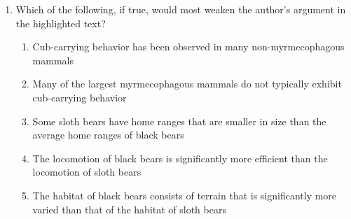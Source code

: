 \documentclass[12pt]{article}
\begin{document}
\begin{enumerate}[label=\textbf{\arabic*.}]
\begin{multicols}{2}

\begin{enumerate}[label=(\Alph*)]

\item explain why sloth bears are not successful foragers in grassland habitats

\item identify the predators that have had the most influence on the behavior of sloth bears

\item suggest a possible reason that sloth bear cubs do not use tree-climbing as a defense

\item provide examples of predators that were once widespread across the Indian subcontinent

\item defend the assertion that sloth bears are under greater threat from dangerous animals than are other bear species

\end{enumerate}

\end{multicols}

\item Which of the following, if true, would most weaken the author's argument in the highlighted text?

\begin{multicols}{2}

\begin{enumerate}[label=(\Alph*)]

\item Cub-carrying behavior has been observed in many non-myrmecophagous mammals

\item Many of the largest myrmecophagous mammals do not typically exhibit cub-carrying behavior

\item Some sloth bears have home ranges that are smaller in size than the average home ranges of black bears

\item The locomotion of black bears is significantly more efficient than the locomotion of sloth bears

\item The habitat of black bears consists of terrain that is significantly more varied than that of the habitat of sloth bears


\end{enumerate}
\end{multicols}
\end{enumerate}
\end{document}
